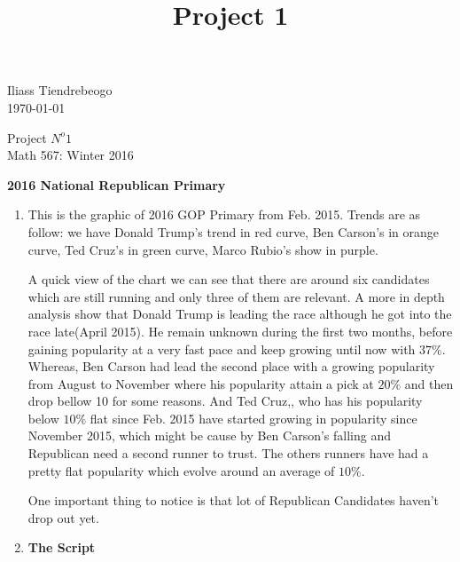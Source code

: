 \documentclass{article}[14pt]
\begin{document}
\begin{center}


\title{Project 1}
\hfill Iliass Tiendrebeogo\\

\hfill \today\\
\end{center}
\bigskip

\begin{center}
  \begin{Large}
      
    Project $N^o 1$ \\
    Math 567: Winter 2016 \\
       
  \end{Large}
\end{center}

\bigskip

\begin{section}
{\bf \large 2016 National Republican Primary}

\begin{enumerate}[]

\item %

This is the graphic of 2016 GOP Primary from Feb. 2015. Trends are as follow: we have Donald Trump's trend in red curve, Ben Carson's  in orange curve, Ted Cruz's in green curve, Marco Rubio's show in purple.

A quick view of the chart we can see that there are around six candidates which are still running and only three of them are  relevant. A more in depth analysis show that Donald Trump is leading the race although he got into the race late(April 2015).  He remain unknown during the first two months, before gaining  popularity at a very fast pace and keep growing until now with   $37\%$. Whereas, Ben Carson  had lead the second place with a growing popularity from August  to November where his popularity attain a pick at $ 20 \%$ and then drop bellow 10 for some reasons. And Ted Cruz,, who has his popularity below $10 \%$ flat since Feb. 2015 have started growing in popularity since November 2015, which might be cause by Ben Carson's falling and Republican need a second runner to trust. The others runners have had a pretty flat popularity which evolve around an average of $10\%$.

One important thing to notice is that lot of Republican Candidates haven't drop out yet.

\item {\bf \large The Script}


\end{enumerate}

\end{section}
\end{document}
